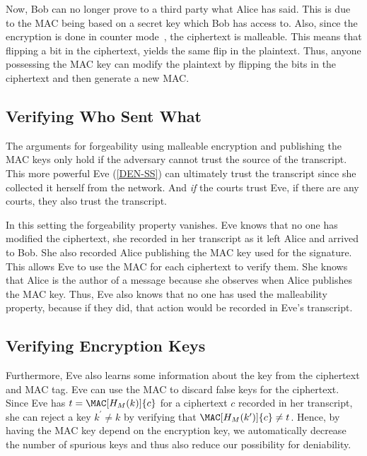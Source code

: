 Now, Bob can no longer prove to a third party what Alice has said.
This is due to the \ac{MAC} being based on a secret key which Bob has access 
to.
Also, since the encryption is done in counter mode~\cite{blockmodes}, the 
ciphertext is malleable.
This means that flipping a bit in the ciphertext, yields the same flip in the 
plaintext.
Thus, anyone possessing the \ac{MAC} key can modify the plaintext by flipping 
the bits in the ciphertext and then generate a new \ac{MAC}.

\subsection{Verifying Who Sent What}

The arguments for forgeability using malleable encryption and publishing the 
\ac{MAC} keys only hold if the adversary cannot trust the source of the 
transcript.
This more powerful Eve (\cref{DEN-SS}) can ultimately trust the transcript 
since she collected it herself from the network.
And \emph{if} the courts trust Eve, if there are any courts, they also trust 
the transcript.

In this setting the forgeability property vanishes.
Eve knows that no one has modified the ciphertext, she recorded in her 
transcript as it left Alice and arrived to Bob.
She also recorded Alice publishing the \ac{MAC} key used for the signature.
This allows Eve to use the \ac{MAC} for each ciphertext to verify them.
She knows that Alice is the author of a message because she observes when Alice 
publishes the \ac{MAC} key.
Thus, Eve also knows that no one has used the malleability property, because if 
they did, that action would be recorded in Eve's transcript.

\subsection{Verifying Encryption Keys}
\label{VerifyingKeys}

Furthermore, Eve also learns some information about the key from the ciphertext 
and \ac{MAC} tag.
Eve can use the \ac{MAC} to discard false keys for the ciphertext.
Since Eve has \(t = \MAC[H_M( k )]{ c }\) for a ciphertext \(c\) recorded in 
her transcript, she can reject a key \(k^\prime\neq k\) by verifying that
\(\MAC[H_M( k^\prime )]{ c } \neq t\).
Hence, by having the \ac{MAC} key depend on the encryption key, we 
automatically decrease the number of spurious keys and thus also reduce our 
possibility for deniability.

